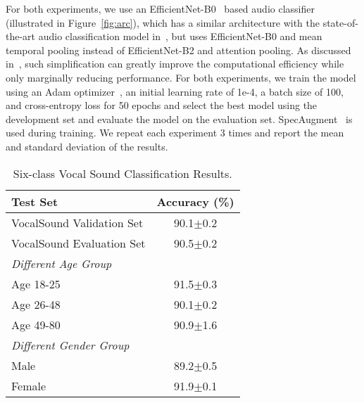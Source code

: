 \documentclass{article}
\newcommand{\squeezeup}{\vspace{-1.6mm}}
\begin{document}
For both experiments, we use an EfficientNet-B0~\cite{tan2019efficientnet} based audio classifier (illustrated in Figure~\ref{fig:arc}), which has a similar architecture with the state-of-the-art audio classification model in~\cite{gong2021psla}, but uses EfficientNet-B0 and mean temporal pooling instead of EfficientNet-B2 and attention pooling. As discussed in~\cite{gong2021psla}, such simplification can greatly improve the computational efficiency while only marginally reducing performance. For both experiments, we train the model using an Adam optimizer~\cite{kingma2014adam}, an initial learning rate of 1e-4, a batch size of 100, and cross-entropy loss for 50 epochs and select the best model using the development set and evaluate the model on the evaluation set. SpecAugment~\cite{park19e_interspeech} is used during training. We repeat each experiment 3 times and report the mean and standard deviation of the results.

\begin{table}[]
\centering
\small
\begin{tabular}{@{}lc@{}}
\toprule
Test Set                                      & Accuracy (\%)                    \\ \midrule
VocalSound Validation Set                     & 90.1$\pm$0.2                       \\
VocalSound Evaluation Set                     & 90.5$\pm$0.2                       \\ \midrule
\multicolumn{2}{l}{\textit{Different Age Group}}    \\ \midrule
Age 18-25                                     & 91.5$\pm$0.3                       \\
Age 26-48                                     & 90.1$\pm$0.2                       \\
Age 49-80                                     & 90.9$\pm$1.6                       \\ \midrule
\multicolumn{2}{l}{\textit{Different Gender Group}} \\ \midrule
Male                                          & 89.2$\pm$0.5                       \\
Female                                        & 91.9$\pm$0.1                       \\ \bottomrule
\end{tabular}
\caption{Six-class Vocal Sound Classification Results.}
\label{tab:exp1}
\squeezeup\squeezeup
\end{table}
\end{document}
